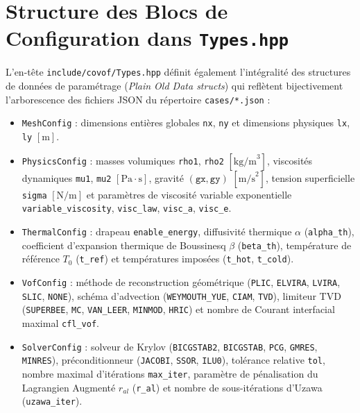 \documentclass[10pt,a4paper,oneside]{book}
\begin{document}
\section{Structure des Blocs de Configuration dans \texttt{Types.hpp}}
L'en-tête \texttt{include/covof/Types.hpp} définit également l'intégralité des structures de données de paramétrage (\emph{Plain Old Data structs}) qui reflètent bijectivement l'arborescence des fichiers JSON du répertoire \texttt{cases/*.json} :
\begin{itemize}
  \item \texttt{MeshConfig} : dimensions entières globales \texttt{nx}, \texttt{ny} et dimensions physiques \texttt{lx}, \texttt{ly} $[\text{m}]$.
  \item \texttt{PhysicsConfig} : masses volumiques \texttt{rho1}, \texttt{rho2} $[\text{kg/m}^3]$, viscosités dynamiques \texttt{mu1}, \texttt{mu2} $[\text{Pa}\cdot\text{s}]$, gravité $(\texttt{gx}, \texttt{gy})$ $[\text{m/s}^2]$, tension superficielle \texttt{sigma} $[\text{N/m}]$ et paramètres de viscosité variable exponentielle \texttt{variable\_viscosity}, \texttt{visc\_law}, \texttt{visc\_a}, \texttt{visc\_e}.
  \item \texttt{ThermalConfig} : drapeau \texttt{enable\_energy}, diffusivité thermique $\alpha$ (\texttt{alpha\_th}), coefficient d'expansion thermique de Boussinesq $\beta$ (\texttt{beta\_th}), température de référence $T_0$ (\texttt{t\_ref}) et températures imposées (\texttt{t\_hot}, \texttt{t\_cold}).
  \item \texttt{VofConfig} : méthode de reconstruction géométrique (\texttt{PLIC}, \texttt{ELVIRA}, \texttt{LVIRA}, \texttt{SLIC}, \texttt{NONE}), schéma d'advection (\texttt{WEYMOUTH\_YUE}, \texttt{CIAM}, \texttt{TVD}), limiteur TVD (\texttt{SUPERBEE}, \texttt{MC}, \texttt{VAN\_LEER}, \texttt{MINMOD}, \texttt{HRIC}) et nombre de Courant interfacial maximal \texttt{cfl\_vof}.
  \item \texttt{SolverConfig} : solveur de Krylov (\texttt{BICGSTAB2}, \texttt{BICGSTAB}, \texttt{PCG}, \texttt{GMRES}, \texttt{MINRES}), préconditionneur (\texttt{JACOBI}, \texttt{SSOR}, \texttt{ILU0}), tolérance relative \texttt{tol}, nombre maximal d'itérations \texttt{max\_iter}, paramètre de pénalisation du Lagrangien Augmenté $r_{al}$ (\texttt{r\_al}) et nombre de sous-itérations d'Uzawa (\texttt{uzawa\_iter}).
\end{itemize}
\end{document}
